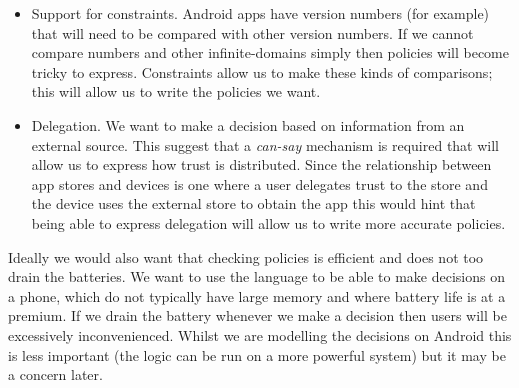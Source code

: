 \documentclass[a4paper,sfsidenotes]{%
  article%
}
\begin{document}
\begin{itemize}
  \item Support for constraints.  Android apps have version numbers (for
    example) that will need to be compared with other version numbers.  If we
    cannot compare numbers and other infinite-domains simply then policies will
    become tricky to express.  Constraints allow us to make these kinds of
    comparisons; this will allow us to write the policies we want.

  \item Delegation.  We want to make a decision based on information from an
    external source.  This suggest that a \emph{can-say} mechanism is required
    that will allow us to express how trust is distributed.   Since the
    relationship between app stores and devices is one where a user delegates
    trust to the store and the device uses the external store to obtain the app
    this would hint that being able to express delegation will allow us to write
    more accurate policies.

\end{itemize}
    
Ideally we would also want that checking policies is efficient and does not too
drain the batteries.  We want to use the language to be able to make decisions
on a phone, which do not typically have large memory and where battery life is
at a premium.  If we drain the battery whenever we make a decision then users
will be excessively inconvenienced.  Whilst we are modelling the decisions on
Android this is less important (the logic can be run on a more powerful system)
but it may be a concern later.

\end{document}
